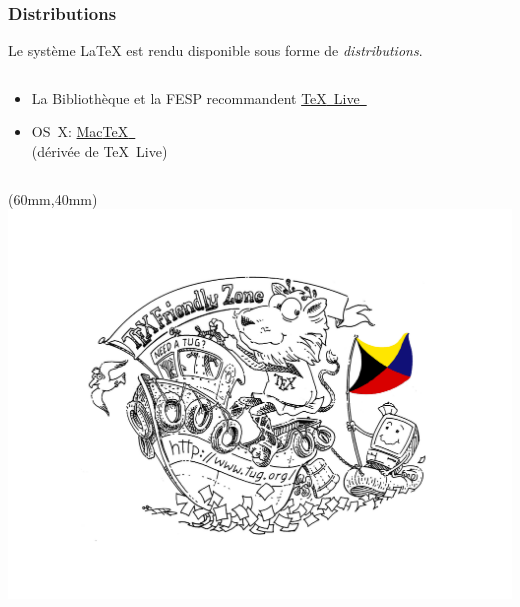 \documentclass[aspectratio=54,10pt,xcolor=x11names]{beamer}
\newcommand{\link}[2]{\href{#1}{#2~\raisebox{-0.2ex}{\faExternalLink}}}
\theoremstyle{example}
\begin{document}
\begin{frame}
  \frametitle{Distributions}

  Le système {\LaTeX} est rendu disponible sous forme de \emph{distributions}.

  \begin{columns}
    \begin{column}{.58\textwidth}
      \begin{itemize}
      \item La Bibliothèque et la FESP recommandent %
        \link{https://www.tug.org/texlive}{{\TeX}~Live}
      \item OS~X: %
        \link{https://www.tug.org/mactex}{Mac{\TeX}} \\ %
        (dérivée de {\TeX}~Live)
      \end{itemize}
    \end{column}
    \begin{column}{.42\textwidth}
    \end{column}
  \end{columns}
  \begin{textblock*}{70mm}(60mm,40mm)
    \includegraphics[width=\linewidth]{TeXFZoneColor}
  \end{textblock*}
\end{frame}
\end{document}
